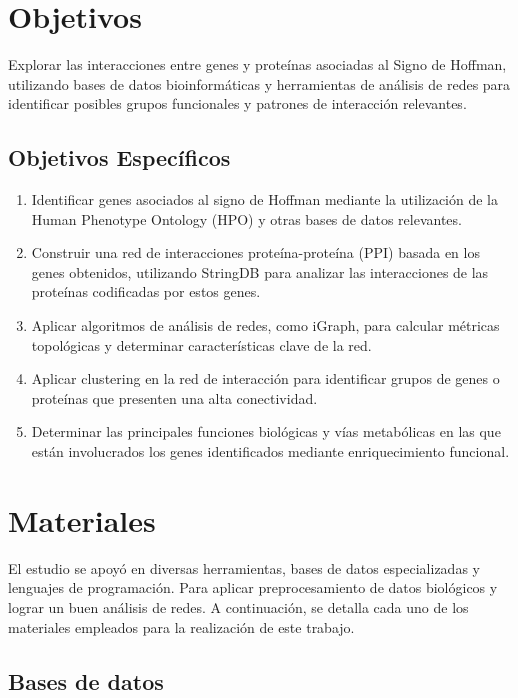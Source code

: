 \section{Objetivos}

Explorar las interacciones entre genes y proteínas asociadas al Signo de Hoffman, utilizando bases de datos bioinformáticas y herramientas de análisis de redes para identificar posibles grupos funcionales y patrones de interacción relevantes.

\subsection{Objetivos Específicos}
\begin{enumerate}
	\item Identificar genes asociados al signo de Hoffman mediante la utilización de la Human Phenotype Ontology (HPO) y otras bases de datos relevantes.
	\item Construir una red de interacciones proteína-proteína (PPI) basada en los genes obtenidos, utilizando StringDB para analizar las interacciones de las proteínas codificadas por estos genes.
	\item Aplicar algoritmos de análisis de redes, como iGraph, para calcular métricas topológicas y determinar características clave de la red.
	\item Aplicar clustering en la red de interacción para identificar grupos de genes o proteínas que presenten una alta conectividad.
	\item Determinar las principales funciones biológicas y vías metabólicas en las que están involucrados los genes identificados mediante enriquecimiento funcional.
\end{enumerate}

\section{Materiales}

El estudio se apoyó en diversas herramientas, bases de datos especializadas y lenguajes de programación. Para aplicar preprocesamiento de datos biológicos y lograr un buen análisis de redes. A continuación, se detalla cada uno de los materiales empleados para la realización de este trabajo.

\subsection{Bases de datos}

